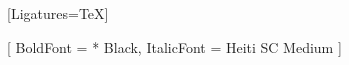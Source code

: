 \usepackage{fontspec}

\setmainfont{Palatino Linotype}[Ligatures=TeX]
\setmonofont{Source Code Pro}
\usepackage{fontawesome}
\usepackage{pifont}

[
  BoldFont = * Black,
  ItalicFont = Heiti SC Medium
]

\usepackage[math-style=TeX]{unicode-math}

\usepackage{microtype}
